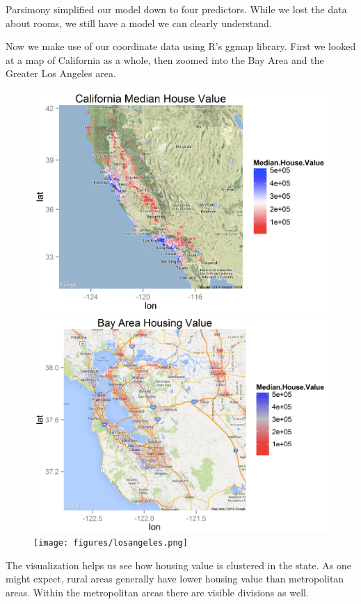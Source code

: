 \documentclass[letter]{article}
\begin{document}
Parsimony simplified our model down to four predictors. While we lost the data about rooms, we still have a model we can clearly understand.  

Now we make use of our coordinate data using R's ggmap library. First we looked at a map of California as a whole, then zoomed into the Bay Area and the Greater Los Angeles area.

\newpage
\begin{figure}[H]
\includegraphics[scale=.25]{figures/california.png}
\includegraphics[scale=.25]{figures/bayarea.png}
\texttt{[image: figures/losangeles.png]}
\end{figure}

The visualization helps us see how housing value is clustered in the state. As one might expect, rural areas generally have lower housing value than metropolitan areas. Within the metropolitan areas there are visible divisions as well. 
\end{document}
